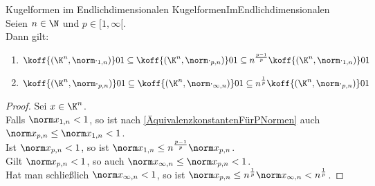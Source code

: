 \begin{korollar}{Kugelformen im Endlichdimensionalen}
                {KugelformenImEndlichdimensionalen}
Seien $n \in \N$ und $p \in [1, \infty[$.\\
Dann gilt:
\begin{enumerate}[(1)]

\item\label{KugelformenImEndlichdimensionalen1}
 $\koff {(\K^n, \norm\cdot_{1, n})} 0 1 
    \subseteq \koff{(\K^n, \norm\cdot_{p, n})} 0 1 \subseteq
     n^{\frac{p-1}p}\koff{(\K^n, \norm\cdot_{1, n})} 0 1$
\item\label{KugelformenImEndlichdimensionalen2}
 $\koff{(\K^n, \norm\cdot_{p, n})} 0 1 \subseteq
     \koff{(\K^n, \norm\cdot_{\infty, n})} 0 1 \subseteq
     n^{\frac 1 p}\koff {(\K^n, \norm\cdot_{p, n})} 0 1$
\end{enumerate}
\end{korollar}
\begin{proof}
Sei $x \in \K^n$.\\
Falls $\norm x _{1, n} < 1$, so ist nach \ref{ÄquivalenzkonstantenFürPNormen}
auch $\norm x _{p, n} \le \norm x _{1, n} < 1$.\\
Ist $\norm x _{p, n} < 1$, so ist $\norm x_{1,n} \le 
n^{\frac{p-1} p}\norm x_{p, n}$.\\
Gilt $\norm x _{p, n} < 1$, so auch $\norm x _{\infty, n} 
\le \norm x _{p, n}< 1$.\\
Hat man schließlich $\norm x _{\infty, n} < 1$, so ist
$\norm x _{p, n} \le n^{\frac 1 p}\norm x _{\infty, n} < n^{\frac 1 p}$.
\end{proof}